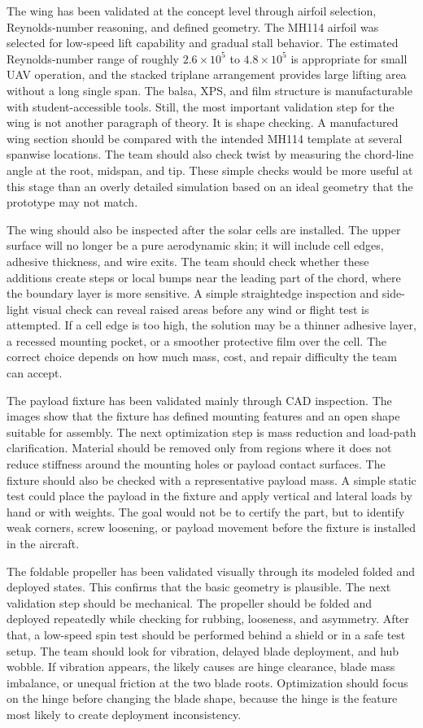 The wing has been validated at the concept level through airfoil selection, Reynolds-number reasoning, and defined geometry. The MH114 airfoil was selected for low-speed lift capability and gradual stall behavior. The estimated Reynolds-number range of roughly \(2.6 \times 10^5\) to \(4.8 \times 10^5\) is appropriate for small UAV operation, and the stacked triplane arrangement provides large lifting area without a long single span. The balsa, XPS, and film structure is manufacturable with student-accessible tools. Still, the most important validation step for the wing is not another paragraph of theory. It is shape checking. A manufactured wing section should be compared with the intended MH114 template at several spanwise locations. The team should also check twist by measuring the chord-line angle at the root, midspan, and tip. These simple checks would be more useful at this stage than an overly detailed simulation based on an ideal geometry that the prototype may not match.

The wing should also be inspected after the solar cells are installed. The upper surface will no longer be a pure aerodynamic skin; it will include cell edges, adhesive thickness, and wire exits. The team should check whether these additions create steps or local bumps near the leading part of the chord, where the boundary layer is more sensitive. A simple straightedge inspection and side-light visual check can reveal raised areas before any wind or flight test is attempted. If a cell edge is too high, the solution may be a thinner adhesive layer, a recessed mounting pocket, or a smoother protective film over the cell. The correct choice depends on how much mass, cost, and repair difficulty the team can accept.

The payload fixture has been validated mainly through CAD inspection. The images show that the fixture has defined mounting features and an open shape suitable for assembly. The next optimization step is mass reduction and load-path clarification. Material should be removed only from regions where it does not reduce stiffness around the mounting holes or payload contact surfaces. The fixture should also be checked with a representative payload mass. A simple static test could place the payload in the fixture and apply vertical and lateral loads by hand or with weights. The goal would not be to certify the part, but to identify weak corners, screw loosening, or payload movement before the fixture is installed in the aircraft.

The foldable propeller has been validated visually through its modeled folded and deployed states. This confirms that the basic geometry is plausible. The next validation step should be mechanical. The propeller should be folded and deployed repeatedly while checking for rubbing, looseness, and asymmetry. After that, a low-speed spin test should be performed behind a shield or in a safe test setup. The team should look for vibration, delayed blade deployment, and hub wobble. If vibration appears, the likely causes are hinge clearance, blade mass imbalance, or unequal friction at the two blade roots. Optimization should focus on the hinge before changing the blade shape, because the hinge is the feature most likely to create deployment inconsistency.

